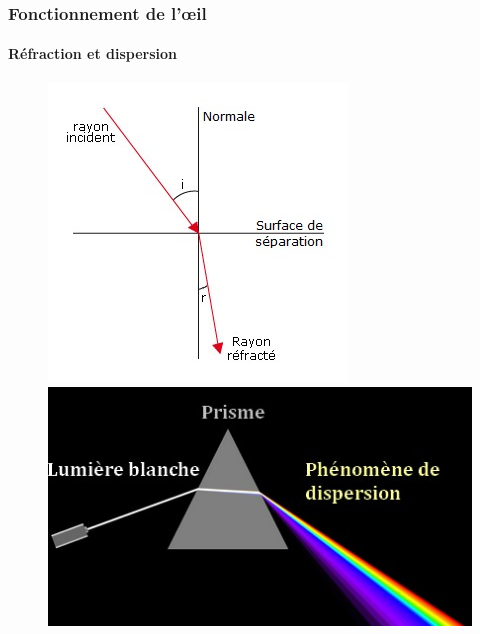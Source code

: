 \documentclass[red]{beamer}
\begin{document}
	\begin{frame}
	\frametitle{Fonctionnement de l'œil}
	\framesubtitle{Réfraction et dispersion}
		\begin{figure}
			\begin{minipage}[c]{.46\linewidth}
				\includegraphics[scale=0.6]{refraction.jpg}
			\end{minipage} \hfill
			\begin{minipage}[c]{.46\linewidth}
		    	\includegraphics[scale=0.35]{dispersion.jpg} 
		    \end{minipage}
		\end{figure}
	\end{frame}	
	
\end{document}
